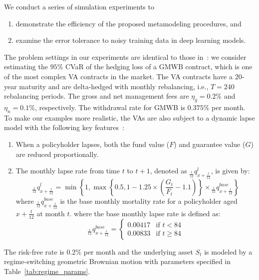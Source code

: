 We conduct a series of simulation experiments to 
\begin{enumerate}
    \item demonstrate the efficiency of the proposed metamodeling procedures, and
    \item examine the error tolerance to noisy training data in deep learning models.
\end{enumerate}
The problem settings in our experiments are identical to those in~\cite{dang2020efficient}:
we consider estimating the $95\%$ CVaR of the hedging loss of a GMWB contract, which is one of the most complex VA contracts in the market.
The VA contracts have a 20-year maturity and are delta-hedged with monthly rebalancing, i.e., $T=240$ rebalancing periods.
The gross and net management fees are $\eta_g = 0.2\%$ and $\eta_n=0.1\%$, respectively.
The withdrawal rate for GMWB is $0.375\%$ per month.
To make our examples more realistic, the VAs are also subject to a dynamic lapse model with the following key features~\citep{naic2021}:
\begin{enumerate}
    \item When a policyholder lapses, both the fund value ($F$) and guarantee value ($G$) are reduced proportionally.
    \item The monthly lapse rate from time $t$ to $t + 1$, denoted as ${}_{\frac{1}{12}}q^l_{x+\frac{t}{12}}$, is given by:
    \begin{equation}
        {}_{\frac{1}{12}}q^l_{x+\frac{t}{12}} = \min\left\{1, \max\left\{0.5, 1 - 1.25 \times \left(\frac{G_t}{F_t} - 1.1\right)\right\} \times {}_{\frac{1}{12}}q^{base}_{x+\frac{t}{12}}\right\}
    \end{equation}
    where ${}_{\frac{1}{12}}q^{base}_{x+\frac{t}{12}}$ is the base monthly mortality rate for a policyholder aged $x + \frac{t}{12}$ at month $t$.
    where the base monthly lapse rate is defined as:
    \begin{equation}
        {}_{\frac{1}{12}}q^{base}_{x+\frac{t}{12}} = 
        \begin{cases}
            0.00417 & \text{if } t < 84 \\
            0.00833 & \text{if } t \geq 84
        \end{cases}
    \end{equation}
\end{enumerate}

The risk-free rate is $0.2\%$ per month and the underlying asset $S_t$ is modeled by a regime-switching geometric Brownian motion with parameters specified in Table~\ref{tab:regime_params}.

